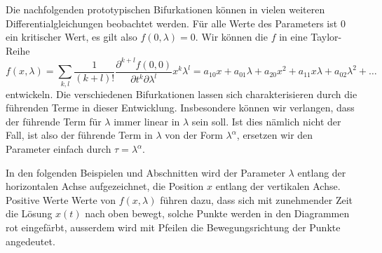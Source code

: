 Die nachfolgenden prototypischen Bifurkationen können in vielen
weiteren Differentialgleichungen beobachtet werden. 
Für alle Werte des Parameters ist $0$ ein kritischer Wert,
es gilt also $f(0,\lambda)=0$.
Wir können die $f$ in eine Taylor-Reihe 
\begin{equation}
f(x,\lambda)
=
\sum_{k,l} \frac{1}{(k+l)!}\frac{\partial^{k+l} f(0,0)}{\partial t^k\partial\lambda^l} x^k\lambda^l
=
a_{10}x + a_{01}\lambda
+
a_{20}x^2 + a_{11}x\lambda + a_{02}\lambda^2 + \dots
\end{equation}
entwickeln.
Die verschiedenen Bifurkationen lassen sich charakterisieren durch
die führenden Terme in dieser Entwicklung.
Insbesondere können wir verlangen, dass der führende Term für $\lambda$
immer linear in $\lambda$ sein soll.
Ist dies nämlich nicht der Fall, ist also der führende Term in 
$\lambda$ von der Form $\lambda^\alpha$, ersetzen wir den
Parameter einfach durch $\tau=\lambda^\alpha$.

In den folgenden Beispielen und Abschnitten wird der Parameter $\lambda$
entlang der horizontalen Achse aufgezeichnet, die Position $x$
entlang der vertikalen Achse.
Positive Werte Werte von $f(x,\lambda)$ führen dazu, dass sich mit zunehmender
Zeit die Lösung $x(t)$ nach oben bewegt, solche Punkte werden in den
Diagrammen rot eingefärbt, ausserdem wird mit Pfeilen die Bewegungsrichtung
der Punkte angedeutet.


